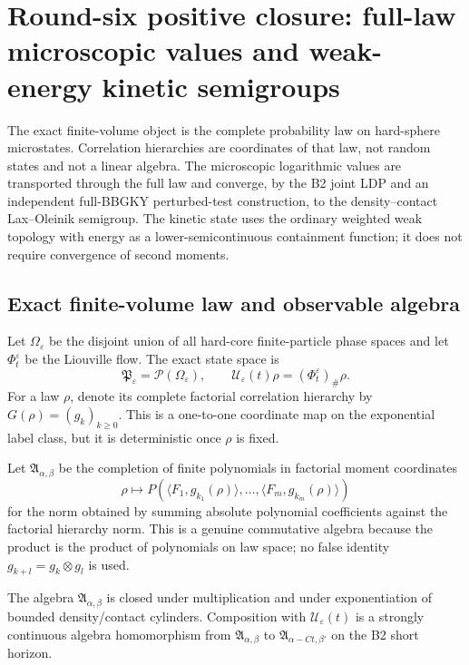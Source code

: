 \section{Round-six positive closure: full-law microscopic values and weak-energy kinetic semigroups}
\label{sec:r6-b4}

The exact finite-volume object is the complete probability law on hard-sphere
microstates.  Correlation hierarchies are coordinates of that law, not random
states and not a linear algebra.  The microscopic logarithmic values are
transported through the full law and converge, by the B2 joint LDP and an
independent full-BBGKY perturbed-test construction, to the density--contact
Lax--Oleinik semigroup.  The kinetic state uses the ordinary weighted weak
topology with energy as a lower-semicontinuous containment function; it does
not require convergence of second moments.

\subsection{Exact finite-volume law and observable algebra}

Let \(\Omega_\varepsilon\) be the disjoint union of all hard-core
finite-particle phase spaces and let \(\Phi_t^\varepsilon\) be the Liouville
flow.  The exact state space is
\[
\mathfrak P_\varepsilon=\mathcal P(\Omega_\varepsilon),
\qquad
\mathcal U_\varepsilon(t)\rho=(\Phi_t^\varepsilon)_\#\rho.
\]
For a law \(\rho\), denote its complete factorial correlation hierarchy by
\(G(\rho)=(g_k)_{k\ge0}\).  This is a one-to-one coordinate map on the
exponential label class, but it is deterministic once \(\rho\) is fixed.

Let \(\mathfrak A_{\alpha,\beta}\) be the completion of finite polynomials in
factorial moment coordinates
\[
\rho\longmapsto
P\left(
\langle F_1,g_{k_1}(\rho)\rangle,\ldots,
\langle F_m,g_{k_m}(\rho)\rangle
\right)
\]
for the norm obtained by summing absolute polynomial coefficients against the
factorial hierarchy norm.  This is a genuine commutative algebra because the
product is the product of polynomials on law space; no false identity
\(g_{k+l}=g_k\otimes g_l\) is used.

\begin{lemma}
\label{lem:r6-b4-algebra}
The algebra \(\mathfrak A_{\alpha,\beta}\) is closed under multiplication and
under exponentiation of bounded density/contact cylinders.  Composition with
\(\mathcal U_\varepsilon(t)\) is a strongly continuous algebra homomorphism
from \(\mathfrak A_{\alpha,\beta}\) to
\(\mathfrak A_{\alpha-Ct,\beta'}\) on the B2 short horizon.
\end{lemma}

